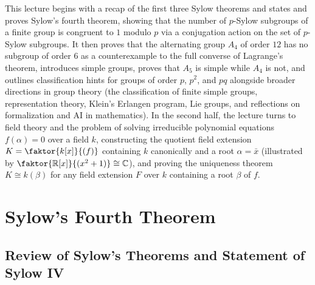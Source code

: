 \begin{overview}
This lecture begins with a recap of the first three Sylow theorems and states and proves Sylow's fourth theorem, showing that the number of $p$-Sylow subgroups of a finite group is congruent to $1$ modulo $p$ via a conjugation action on the set of $p$-Sylow subgroups. It then proves that the alternating group $A_4$ of order $12$ has no subgroup of order $6$ as a counterexample to the full converse of Lagrange's theorem, introduces simple groups, proves that $A_5$ is simple while $A_4$ is not, and outlines classification hints for groups of order $p$, $p^2$, and $pq$ alongside broader directions in group theory (the classification of finite simple groups, representation theory, Klein's Erlangen program, Lie groups, and reflections on formalization and AI in mathematics). In the second half, the lecture turns to field theory and the problem of solving irreducible polynomial equations $f(\alpha) = 0$ over a field $k$, constructing the quotient field extension $K = \faktor{k[x]}{(f)}$ containing $k$ canonically and a root $\alpha = \bar{x}$ (illustrated by $\faktor{\mathbb{R}[x]}{(x^2+1)} \cong \mathbb{C}$), and proving the uniqueness theorem $K \cong k(\beta)$ for any field extension $F$ over $k$ containing a root $\beta$ of $f$.
\end{overview}

\section{Sylow's Fourth Theorem}

\subsection{Review of Sylow's Theorems and Statement of Sylow IV}

